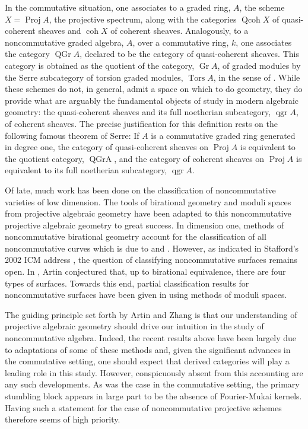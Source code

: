 In the commutative situation, one associates to a graded ring, \(A\), the scheme \(X = \operatorname{Proj} A\), the projective spectrum, along with the categories \(\operatorname{Qcoh} X\) of quasi-coherent sheaves and \(\operatorname{coh} X\) of coherent sheaves.
Analogously, to a noncommutative graded algebra, \(A\), over a commutative ring, \(k\), one associates the category \(\operatorname{QGr} A\), declared to be the category of quasi-coherent sheaves.
This category is obtained as the quotient of the category, \(\operatorname{Gr} A\), of graded modules by the Serre subcategory of torsion graded modules, \(\operatorname{Tors} A\), in the sense of \textcite{DCA62}.
While these schemes do not, in general, admit a space on which to do geometry, they do provide what are arguably the fundamental objects of study in modern algebraic geometry: the quasi-coherent sheaves and its full noetherian subcategory, \(\operatorname{qgr} A\), of coherent sheaves.
The  precise justification for this definition rests on the following famous theorem of Serre: If \(A\) is a commutative graded ring generated in degree one, the category of quasi-coherent sheaves on \(\operatorname{Proj} A\) is equivalent to the quotient category, \(\operatorname{QGr A}\), and the category of coherent sheaves on \(\operatorname{Proj} A\) is equivalent to its full noetherian subcategory, \(\operatorname{qgr} A\).

Of late, much work has been done on the classification of noncommutative varieties of low dimension.
The tools of birational geometry and moduli spaces from projective algebraic geometry have been adapted to this noncommutative projective algebraic geometry to great success.
In dimension one, methods of noncommutative birational geometry account for the classification of all noncommutative curves which is due to \textcite{AS95} and \textcite{Reiten-VdB02}.
However, as indicated in Stafford's 2002 ICM address \parencite{Stafford02}, the question of classifying noncommutative surfaces remains open.
In \textcite{Artin97}, Artin conjectured that, up to birational equivalence, there are four types of surfaces.
Towards this end, partial classification results for noncommutative surfaces have been given in \textcite{ATV90,Stephenson96,Stephenson97} using methods of moduli spaces.

The guiding principle set forth by Artin and Zhang is that our understanding of projective algebraic geometry should drive our intuition in the study of noncommutative algebra.
Indeed, the recent results above have been largely due to adaptations of some of these methods and, given the significant advances in the commutative setting, one should expect that derived categories will play a leading role in this study.
However, conspicuously absent from this accounting are any such developments.
As was the case in the commutative setting, the primary stumbling block appears in large part to be the absence of Fourier-Mukai kernels.
Having such a statement for the case of noncommutative projective schemes therefore seems of high priority.
